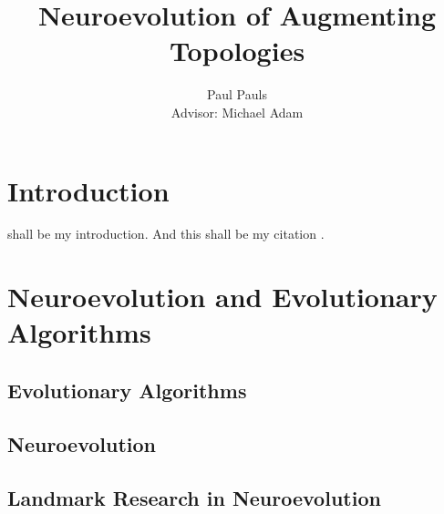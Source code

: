 \documentclass[journal, a4paper]{IEEEtran}
\begin{document}
\title{Neuroevolution of Augmenting Topologies}
\author{Paul Pauls\\
        Advisor: Michael Adam}
\maketitle


\tableofcontents

\begin{abstract}
    \blindtext
\end{abstract}


\section{Introduction}

 shall be my introduction. And this shall be my citation \cite{cite01}.
\blindtext




\section{Neuroevolution and Evolutionary Algorithms}


\subsection{Evolutionary Algorithms}


\subsection{Neuroevolution}


\subsection{Landmark Research in Neuroevolution}
\end{document}
